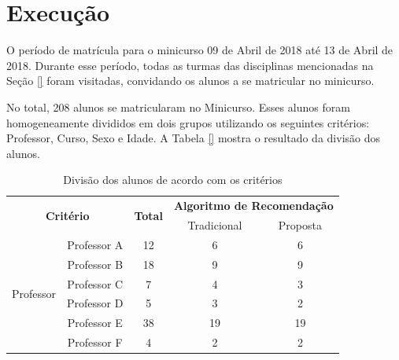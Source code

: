 \section{Execução}\label{section:execucao-experimento}

O período de matrícula para o minicurso 09 de Abril de 2018 até 13 de Abril de 2018. Durante esse período, todas as turmas
das disciplinas mencionadas na Seção \ref{} foram visitadas, convidando os alunos a se matricular no minicurso.

No total, 208 alunos se matricularam no Minicurso. Esses alunos foram homogeneamente divididos em dois grupos utilizando os
seguintes critérios: Professor, Curso, Sexo e Idade. A Tabela \ref{} mostra o resultado da divisão dos alunos.

\begin{table}[ht]
\footnotesize
\caption[Divisão dos alunos de acordo com os critérios]{Divisão dos alunos de acordo com os critérios}
\label{tab:divisao-alunos-experimento}
\centering
\begin{tabular}{ccccc}
  \multicolumn{2}{c}{\multirow{2}{*}{\textbf{Critério}}}           & \multirow{2}{*}{\textbf{Total}}           & \multicolumn{2}{c}{\textbf{Algoritmo de Recomendação}} \\
                                        &                          &                                           & Tradicional          & Proposta                        \\
  \hline
  \multirow{12}{*}{Professor}           & Professor A              & 12                                        & 6                    & 6                               \\
                                        & Professor B              & 18                                        & 9                    & 9                               \\
                                        & Professor C              & 7                                         & 4                    & 3                               \\
                                        & Professor D              & 5                                         & 3                    & 2                               \\
                                        & Professor E              & 38                                        & 19                   & 19                              \\
                                        & Professor F              & 4                                         & 2                    & 2                               \\

\end{tabular}
\end{table}
